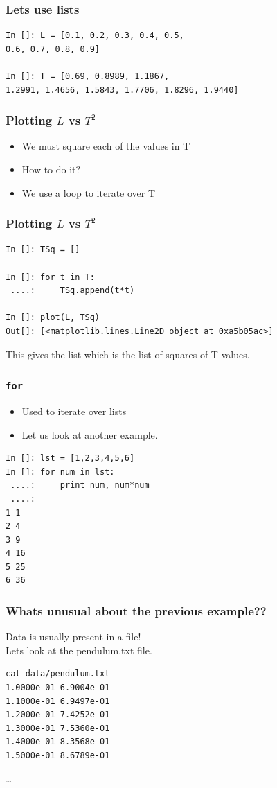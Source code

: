 \documentclass[14pt,compress]{beamer}
\newcommand{\kwrd}[1]{ \texttt{\textbf{\color{blue}{#1}}}  }
\begin{document}
\begin{frame}[fragile]
\frametitle{Lets use lists}
\begin{lstlisting}
In []: L = [0.1, 0.2, 0.3, 0.4, 0.5, 
0.6, 0.7, 0.8, 0.9]

In []: T = [0.69, 0.8989, 1.1867, 
1.2991, 1.4656, 1.5843, 1.7706, 1.8296, 1.9440]
\end{lstlisting}
\end{frame}

\begin{frame}[fragile]
\frametitle{Plotting $L$ vs $T^2$}
\begin{itemize}
\item We must square each of the values in T
\item How to do it?
\item We use a \kwrd{for} loop to iterate over T
\end{itemize}
\end{frame}

\begin{frame}[fragile]
\frametitle{Plotting $L$ vs $T^2$}
\begin{lstlisting}
In []: TSq = []

In []: for t in T:
 ....:     TSq.append(t*t)

In []: plot(L, TSq)
Out[]: [<matplotlib.lines.Line2D object at 0xa5b05ac>]
\end{lstlisting}
This gives the list \kwrd{TSq} which is the list of squares of T values.
\end{frame}

\begin{frame}[fragile]
\frametitle{\texttt{for}}
\begin{itemize}
\item Used to iterate over lists
\item Let us look at another example.
\end{itemize}
\begin{lstlisting}
In []: lst = [1,2,3,4,5,6]
In []: for num in lst:
 ....:     print num, num*num
 ....:    
1 1
2 4
3 9
4 16
5 25
6 36
\end{lstlisting}
\end{frame}

\begin{frame}[fragile]
\frametitle{Whats unusual about the previous example??}
\alert{Data is usually present in a file!} \\
Lets look at the pendulum.txt file.
\begin{lstlisting}
cat data/pendulum.txt
1.0000e-01 6.9004e-01
1.1000e-01 6.9497e-01
1.2000e-01 7.4252e-01
1.3000e-01 7.5360e-01
1.4000e-01 8.3568e-01
1.5000e-01 8.6789e-01
\end{lstlisting}
\ldots
\end{frame}
\end{document}
